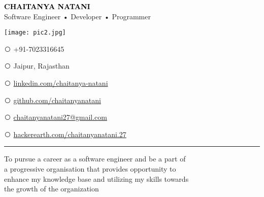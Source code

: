 \documentclass[9pt]{myOwnClass}
\begin{document}
\begin{minipage}[t]{0.70\textwidth}
	\vspace{-\baselineskip}
	\fontsize{40}{0}\textcolor{black}{\textbf{CHAITANYA NATANI}}\\
	\large Software Engineer • Developer • Programmer\\
\end{minipage}
\hfill
\begin{minipage}[t]{0.30\textwidth}
\vspace{-\baselineskip}
\texttt{[image: pic2.jpg]}\\
\end{minipage}
\vspace{0.2cm}
\def\ci#1{\textcircled{\resizebox{.5em}{!}{#1}}}
\begin{minipage}[t]{0.33\textwidth}
\ci{\faPhone} +91-7023316645\par
\ci{\faHome} Jaipur, Rajasthan\par
\par	
\end{minipage}
\begin{minipage}[t]{0.33\textwidth}
\ci{\faLinkedin} {\href{https://www.linkedin.com/in/chaitanya-natani/}{linkedin.com/chaitanya-natani}}\par
\ci{\faGithub} {\href{https://github.com/chaitanyanatani/}{github.com/chaitanyanatani}}\par
\end{minipage}
\begin{minipage}[t]{0.33\textwidth}
\ci{\faEnvelope} {\href{mailto:chaitanyanatani27@gmail.com}{chaitanyanatani27@gmail.com}}\par
\ci{\faCode} {\href{https://www.hackerearth.com/@chaitanyanatani.27/}{hackerearth.com/chaitanyanatani.27}}\par
\end{minipage}
\vspace{0.02cm}
\par\noindent\rule{\textwidth}{0.7pt}

\begin{minipage}[t]{0.6\textwidth}
	\vspace{-\baselineskip}
	
To pursue a career as a software engineer and be a part of \\a progressive organisation that provides opportunity to \\enhance my knowledge base and utilizing my skills towards\\ the growth of the organization
\end{minipage}
\hfill
\begin{minipage}[t]{0.4\textwidth}
	\vspace{-\baselineskip}
	\begin{barchart}{5.5}
	\end{barchart}
\end{minipage}
\end{document}
